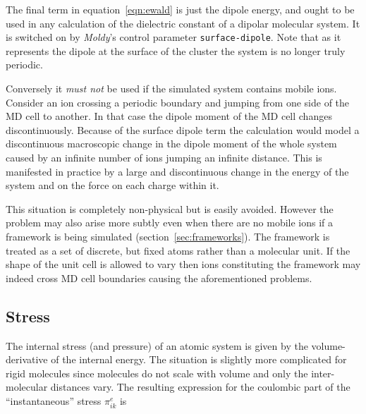 \documentclass[twoside]{report}
\newcommand{\moldy}{{\em Moldy}}
\begin{document}
The final term in equation~\ref{eqn:ewald} is just the dipole energy,
and ought to be used in any calculation of the dielectric constant of
a dipolar molecular system.  It is switched on by \moldy's control
parameter \texttt{surface-dipole}.  Note that as it represents the
dipole at the surface of the cluster the system is no longer truly
periodic.

Conversely it {\em must not\/} be used if the simulated system contains
mobile ions.  Consider an ion crossing a periodic boundary and jumping
from one side of the MD cell to another.  In that case the dipole
moment of the MD cell changes discontinuously.   Because of the
surface dipole term the calculation would model a discontinuous
macroscopic change in the dipole moment of the whole system caused by
an infinite number of ions jumping an infinite distance.  This is
manifested in practice by a large and discontinuous change in the
energy of the system and on the force on each charge within it.

This situation is completely non-physical but is easily avoided.
However the problem may also arise more subtly even when there are no
mobile ions if a framework is being simulated
(section~\ref{sec:frameworks}).  The framework is treated as a set of
discrete, but fixed atoms rather than a molecular unit.  If the shape
of the unit cell is allowed to vary then ions constituting the
framework may indeed cross MD cell boundaries causing the
aforementioned problems.

\subsection{Stress}

The internal stress (and pressure) of an atomic system is given by the
volume-derivative of the internal energy.  The situation is slightly
more complicated for rigid molecules since molecules do not scale with
volume and only the inter-molecular distances vary.  The resulting
expression for the coulombic part of the ``instantaneous'' stress
$\pi_{ik}^e$ is\cite[Appendix A]{nose:83}
\end{document}
